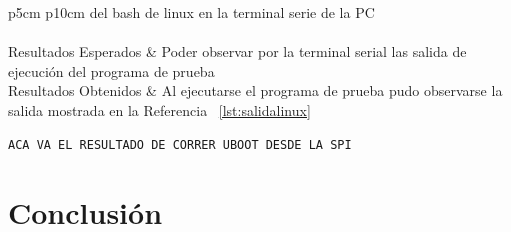 \begin{table}[h!]
\begin{tabular}{ p{5cm} p{10cm}  }
		del bash de linux en la terminal serie de la PC\\
		\hline	{}\\
		\hline			   Resultados Esperados & Poder observar por la terminal serial las salida de ejecución del programa de prueba \\
		\hline	 		   Resultados Obtenidos & Al ejecutarse el programa de prueba pudo observarse la salida mostrada en la Referencia ~\ref{lst:salidalinux}\\
		\hline	
		\end{tabular}
		\caption{Caso de prueba T014}
		\end{table}

\begin{lstlisting}[frame=single,caption={Salida de la ejecución del programa de prueba ejecutado en Linux Embebido},label={lst:salidalinux}]
 ACA VA EL RESULTADO DE CORRER UBOOT DESDE LA SPI
\end{lstlisting}		
		
		\section{Conclusión}
		
		
		
		
		
		
		
		
		
		
